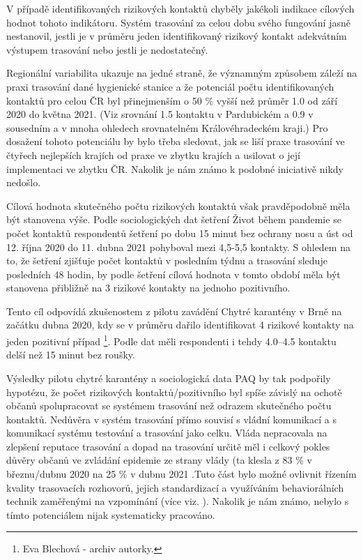 V případě identifikovaných rizikových kontaktů chyběly jakékoli indikace cílových hodnot tohoto indikátoru. Systém trasování za celou dobu svého fungování jasně nestanovil, jestli je v průměru jeden identifikovaný rizikový kontakt adekvátním výstupem trasování nebo jestli je nedostatečný.

Regionální variabilita ukazuje na jedné straně, že významným způsobem záleží na praxi trasování dané hygienické stanice a že potenciál počtu identifikovaných kontaktů pro celou ČR byl přinejmenším o 50 \% vyšší než průměr 1.0 od září 2020 do května 2021. (Viz srovnání 1.5 kontaktu v Pardubickém a 0.9 v sousedním a v mnoha ohledech srovnatelném Královéhradeckém kraji.) Pro dosažení tohoto potenciálu by bylo třeba sledovat, jak se liší praxe trasování ve čtyřech nejlepších krajích od praxe ve zbytku krajích a usilovat o její implementaci ve zbytku ČR. Nakolik je nám známo k podobné iniciativě nikdy nedošlo.

Cílová hodnota skutečného počtu rizikových kontaktů však pravděpodobně měla být stanovena výše. Podle sociologických dat šetření Život během pandemie \cite{tr_PAQ01} se počet kontaktů respondentů šetření po dobu 15 minut bez ochrany nosu a úst od 12. října 2020 do 11. dubna 2021 pohyboval mezi 4,5-5,5 kontakty. S ohledem na to, že šetření zjišťuje počet kontaktů v posledním týdnu a trasování sleduje posledních 48 hodin, by podle šetření cílová hodnota v tomto období měla být stanovena přibližně na 3 rizikové kontakty na jednoho pozitivního.

Tento cíl odpovídá zkušenostem z pilotu zavádění Chytré karantény v Brně na začátku dubna 2020, kdy se v průměru dařilo identifikovat 4 rizikové kontakty na jeden pozitivní případ \footnote{Eva Blechová - archiv autorky.}. Podle dat \cite{tr_PAQ01} měli respondenti i tehdy 4.0--4.5 kontaktu delší než 15 minut bez roušky.

Výsledky pilotu chytré karantény a sociologická data PAQ by tak podpořily hypotézu, že počet rizikových kontaktů/pozitivního byl spíše závislý na ochotě občanů spolupracovat se systémem trasování než odrazem skutečného počtu kontaktů. Nedůvěra v systém trasování přímo souvisí s vládní komunikací a s komunikací systému testování a trasování jako celku. Vláda nepracovala na zlepšení reputace trasování \cite{tr_bisop05} a dopad na trasování určitě měl i celkový pokles důvěry občanů ve zvládání epidemie ze strany vlády (ta klesla z 83 \% v březnu/dubnu 2020 na 25 \% v dubnu 2021 \cite{tr_STEM}.Tuto část bylo možné ovlivnit řízením kvality trasovacích rozhovorů, jejich standardizací a využíváním behaviorálních technik zaměřenými na vzpomínání (více viz. \cite{tr_bisop06}). Nakolik je nám známo, nebylo s tímto potenciálem nijak systematicky pracováno.

